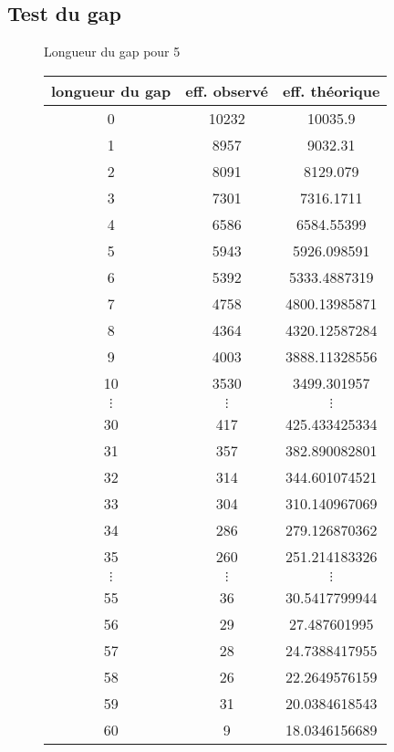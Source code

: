 \documentclass[a4paper,10pt]{article}
\begin{document}
\subsection{Test du gap}

\begin{figure}[H]
\caption{Longueur du gap pour 5}
\label{khi2histo}
\end{figure}


\begin{figure}[H]
\begin{center}
\begin{longtable}{|c|c|c|}
\hline
longueur du gap & eff. observé & eff. théorique \\
\hline
0 & 10232 & 10035.9\\
1 & 8957 & 9032.31\\
2 & 8091 & 8129.079\\
3 & 7301 & 7316.1711\\
4 & 6586 & 6584.55399\\
5 & 5943 & 5926.098591\\
6 & 5392 & 5333.4887319\\
7 & 4758 & 4800.13985871\\
8 & 4364 & 4320.12587284\\
9 & 4003 & 3888.11328556\\
10 & 3530 & 3499.301957\\
$\vdots$ & $\vdots$ & $\vdots$ \\ 
30 & 417 & 425.433425334\\
31 & 357 & 382.890082801\\
32 & 314 & 344.601074521\\
33 & 304 & 310.140967069\\
34 & 286 & 279.126870362\\
35 & 260 & 251.214183326\\
$\vdots$ & $\vdots$ & $\vdots$ \\ 
55 & 36 & 30.5417799944\\
56 & 29 & 27.487601995\\
57 & 28 & 24.7388417955\\
58 & 26 & 22.2649576159\\
59 & 31 & 20.0384618543\\
60 & 9 & 18.0346156689\\

\end{longtable}
\end{center}
\end{figure}
\end{document}
